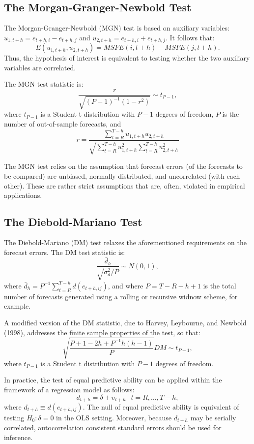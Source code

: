 \documentclass[
  12pt,
  oneside]{book}
\begin{document}
\hypertarget{the-morgan-granger-newbold-test}{%
\subsection{The Morgan-Granger-Newbold Test}\label{the-morgan-granger-newbold-test}}

The Morgan-Granger-Newbold (MGN) test is based on auxiliary variables: \(u_{1,t+h} = e_{t+h,i}-e_{t+h,j}\) and \(u_{2,t+h} = e_{t+h,i}+e_{t+h,j}\). It follows that: \[E(u_{1,t+h},u_{2,t+h}) = MSFE(i,t+h)-MSFE(j,t+h).\] Thus, the hypothesis of interest is equivalent to testing whether the two auxiliary variables are correlated.

The MGN test statistic is: \[\frac{r}{\sqrt{(P-1)^{-1}(1-r^2)}}\sim t_{P-1},\] where \(t_{P-1}\) is a Student t distribution with \(P-1\) degrees of freedom, \(P\) is the number of out-of-sample forecasts, and \[r=\frac{\sum_{t=R}^{T-h}{u_{1,t+h}u_{2,t+h}}}{\sqrt{\sum_{t=R}^{T-h}{u_{1,t+h}^2}\sum_{t=R}^{T-h}{u_{2,t+h}^2}}}\]

The MGN test relies on the assumption that forecast errors (of the forecasts to be compared) are unbiased, normally distributed, and uncorrelated (with each other). These are rather strict assumptions that are, often, violated in empirical applications.

\hypertarget{the-diebold-mariano-test}{%
\subsection{The Diebold-Mariano Test}\label{the-diebold-mariano-test}}

The Diebold-Mariano (DM) test relaxes the aforementioned requirements on the forecast errors. The DM test statistic is: \[\frac{\bar{d}_h}{\sqrt{\sigma_d^2/P}} \sim N(0,1),\] where \(\bar{d}_h=P^{-1}\sum_{t=R}^{T-h} d(e_{t+h,ij})\), and where \(P=T-R-h+1\) is the total number of forecasts generated using a rolling or recursive widnow scheme, for example.

A modified version of the DM statistic, due to Harvey, Leybourne, and Newbold (1998), addresses the finite sample properties of the test, so that: \[\sqrt{\frac{P+1-2h+P^{-1}h(h-1)}{P}}DM\sim t_{P-1},\] where \(t_{P-1}\) is a Student t distribution with \(P-1\) degrees of freedom.

In practice, the test of equal predictive ability can be applied within the framework of a regression model as follows: \[d_{t+h} = \delta + \upsilon_{t+h}\;~~t = R,\ldots,T-h,\] where \(d_{t+h} \equiv d(e_{t+h,ij})\). The null of equal predictive ability is equivalent of testing \(H_0: \delta = 0\) in the OLS setting. Moreover, because \(d_{t+h}\) may be serially correlated, autocorrelation consistent standard errors should be used for inference.
\end{document}
